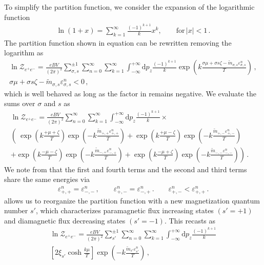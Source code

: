 To simplify the partition function, we consider the expansion of the logarithmic function
\begin{align}
\ln\left(1+x\right)=\sum^{\infty}_{k=1}\frac{(-1)^{k+1}}{k}x^k,\qquad\mathrm{for}\,|x|<1\,.
\end{align}
The partition function shown in equation  can be rewritten removing the logarithm as
\begin{gather}
\label{partitionpower:1}
\ln{\mathcal{Z}_{e^{+}e^{-}}}=\frac{e{B}V}{(2\pi)^{2}}\sum_{\sigma,s}^{\pm1}\sum_{n=0}^{\infty}\sum_{k=1}^{\infty}\int_{-\infty}^{+\infty}\mathrm{d}p_{z}
\frac{(-1)^{k+1}}{k}\exp\left({k\frac{\sigma\mu+\sigma s\zeta-{\tilde m}_{\sigma,s}\varepsilon^{n}_{\sigma,s}}{T}}\right)\,,\\
\label{bapprox} 
\sigma\mu+\sigma s\zeta-{\tilde m}_{\sigma,s}\varepsilon_{\sigma,s}^{n}<0\,,
\end{gather}
which is well behaved as long as the factor in  remains negative. We evaluate the sums over $\sigma$ and $s$ as
\begin{multline}
 \label{partitionpower:2}
 \ln{\mathcal{Z}_{e^{+}e^{-}}}=\frac{e{B}V}{(2\pi)^{2}}\sum_{n=0}^{\infty}\sum_{k=1}^{\infty}\int_{-\infty}^{+\infty}\mathrm{d}p_{z}\frac{(-1)^{k+1}}{k}\times\\
 \left(\ \exp\left(k\frac{+\mu+\zeta}{T}\right)\exp\left(-k\frac{{\tilde m}_{+,+}\varepsilon_{+,+}^{n}}{T}\right)\right.
 +\exp\left(k\frac{+\mu-\zeta}{T}\right)\exp\left(-k\frac{{\tilde m}_{+,-}\varepsilon_{+,-}^{n}}{T}\right)\qquad\\
 +\exp\left(k\frac{-\mu-\zeta}{T}\right)\exp\left(-k\frac{{\tilde m}_{-,+}\varepsilon_{-,+}^{n}}{T}\right)
 +\left.\exp\left(k\frac{-\mu+\zeta}{T}\right)\exp\left(-k\frac{{\tilde m}_{-,-}\varepsilon_{-,-}^{n}}{T}\right)\right)\,.
\end{multline}
We note from  that the first and fourth terms and the second and third terms share the same energies via
\begin{align}
 \label{partitionpower:3}
 \varepsilon_{+,+}^{n}=\varepsilon_{-,-}^{n}\,,\qquad
 \varepsilon_{+,-}^{n}=\varepsilon_{-,+}^{n}\,.\qquad
 \varepsilon_{+,-}^{n}<\varepsilon_{+,+}^{n}\,.
\end{align}
 allows us to reorganize the partition function with a new magnetization quantum number $s'$, which characterizes paramagnetic flux increasing states $(s'=+1)$ and diamagnetic flux decreasing states $(s'=-1)$. This recasts  as
\begin{multline}
 \label{partitionpower:4}
 \ln{\mathcal{Z}_{e^{+}e^{-}}}=\frac{e{B}V}{(2\pi)^{2}}\sum_{s'}^{\pm1}\sum_{n=0}^{\infty}\sum_{k=1}^{\infty}\int_{-\infty}^{+\infty}\mathrm{d}p_{z}\frac{(-1)^{k+1}}{k}\\
 \left[2\xi_{s'}\cosh\frac{k\mu}{T}\right]\exp\left(-k\frac{{\tilde m}_{s'}\varepsilon_{s'}^{n}}{T}\right)\,,
\end{multline}
